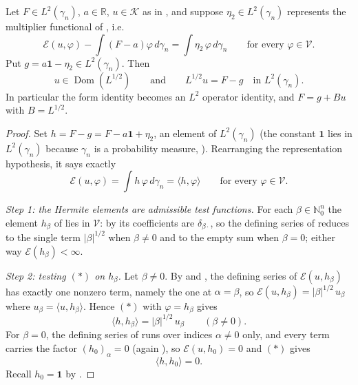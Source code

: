 \begin{lemma}
Let $F \in L^2(\gamma_n)$, $a \in \mathbb{R}$, $u \in \mathcal{K}$ as in
, and suppose $\eta_2 \in L^2(\gamma_n)$ represents the
multiplier functional of , i.e.
\[
  \mathcal{E}(u, \varphi) - \int (F-a)\varphi\, d\gamma_n
    = \int \eta_2\,\varphi \, d\gamma_n
  \qquad\text{for every } \varphi \in \mathcal{V} .
\]
Put $g = a\mathbf{1} - \eta_2 \in L^2(\gamma_n)$.  Then
\[
  u \in \operatorname{Dom}(L^{1/2})
  \qquad\text{and}\qquad
  L^{1/2} u = F - g \quad\text{in } L^2(\gamma_n) .
\]
In particular the form identity becomes an $L^2$ operator identity, and
$F = g + Bu$ with $B = L^{1/2}$.
\end{lemma}
\begin{proof}
Set $h = F - g = F - a\mathbf{1} + \eta_2$, an element of $L^2(\gamma_n)$ (the
constant $\mathbf{1}$ lies in $L^2(\gamma_n)$ because $\gamma_n$ is a probability
measure, ).  Rearranging the representation hypothesis, it
says exactly
\begin{equation*}
  \mathcal{E}(u,\varphi) = \int h\,\varphi\, d\gamma_n = \langle h, \varphi\rangle
  \qquad\text{for every } \varphi \in \mathcal{V} . \tag{$*$}
\end{equation*}

\emph{Step 1: the Hermite elements are admissible test functions.}
For each $\beta \in \mathbb{N}_0^n$ the element $h_\beta$ of 
lies in $\mathcal{V}$: by  its coefficients are
$\delta_{\beta\cdot}$, so the defining series of  reduces to the
single term $|\beta|^{1/2}$ when $\beta \neq 0$ and to the empty sum when
$\beta = 0$; either way $\mathcal{E}(h_\beta) < \infty$.

\emph{Step 2: testing $(*)$ on $h_\beta$.}
Let $\beta \neq 0$.  By  and ,
the defining series of $\mathcal{E}(u, h_\beta)$ has exactly one nonzero term,
namely the one at $\alpha = \beta$, so
$\mathcal{E}(u, h_\beta) = |\beta|^{1/2}\, u_\beta$ where
$u_\beta = \langle u, h_\beta\rangle$.  Hence $(*)$ with $\varphi = h_\beta$ gives
\begin{equation*}
  \langle h, h_\beta\rangle = |\beta|^{1/2}\, u_\beta \qquad (\beta \neq 0).
  \tag{1}
\end{equation*}
For $\beta = 0$, the defining series of  runs over indices
$\alpha \neq 0$ only, and every term carries the factor
$(h_0)_\alpha = 0$ (again ), so
$\mathcal{E}(u, h_0) = 0$ and $(*)$ gives
\begin{equation*}
  \langle h, h_0\rangle = 0 . \tag{2}
\end{equation*}
Recall $h_0 = \mathbf{1}$ by .


\end{proof}
